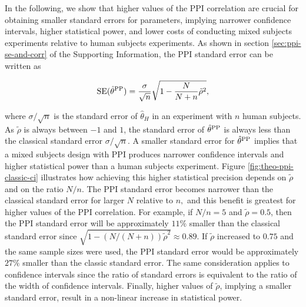 \documentclass{article}
\begin{document}
In the following, we show that higher values of the PPI correlation are crucial for obtaining smaller standard errors for parameters, implying narrower confidence intervals, higher statistical power, and lower costs of conducting mixed subjects experiments relative to human subjects experiments. 
As shown in section \ref{sec:ppi-se-and-corr} of the Supporting Information, the PPI standard error can be written as 

\begin{equation}\label{eq:PPI-se}
    \mathrm{SE}(\hat{\theta}^{\mathrm{PP}}) = \frac{\sigma}{\sqrt{n}}\sqrt{1 - \frac{N}{N+n}\tilde{\rho}^2},
\end{equation}

where $\sigma/\sqrt{n}$ is the standard error of $\hat{\theta}_H$ in an experiment with $n$ human subjects. As $\tilde{\rho}$ is always between $-1$ and $1$, the standard error of $\hat{\theta}^{\mathrm{PP}}$ is always less than the classical standard error $\sigma/\sqrt{n}$. A smaller standard error for $\hat \theta^{\mathrm{PP}}$ implies that a mixed subjects design with PPI produces narrower confidence intervals and higher statistical power than a human subjects experiment. Figure \ref{fig:theo-ppi-classic-ci} illustrates how achieving this higher statistical precision depends on $\tilde{\rho}$ and on the ratio $N/n$. The PPI standard error becomes narrower than the classical standard error for larger $N$ relative to $n,$ and this benefit is greatest for higher values of the PPI correlation. For example, if $N/n = 5$ and $\tilde{\rho} = 0.5$, then the PPI standard error will be approximately $11\%$ smaller than the classical standard error since $\sqrt{1-(N/(N+n))\tilde{\rho}^2} \approx 0.89$. If $\tilde{\rho}$ increased to $0.75$ and the same sample sizes were used, the PPI standard error would be approximately $27\%$ smaller than the classic standard error. The same consideration applies to confidence intervals since the ratio of standard errors is equivalent to the ratio of the width of confidence intervals. Finally, higher values of $\tilde{\rho}$, implying a smaller standard error, result in a non-linear increase in statistical power.

\clearpage
\end{document}

